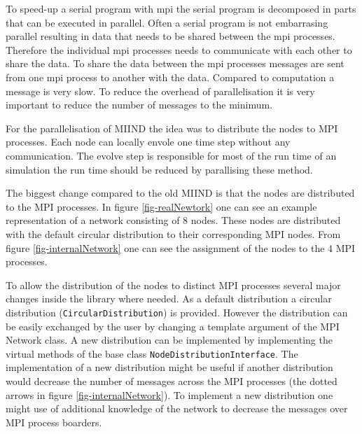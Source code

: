\documentclass[12pt]{article}
\begin{document}
To speed-up a serial program with mpi the serial program is decomposed in parts that can be executed in parallel.
Often a serial program is not embarrasing parallel resulting in data that needs to be shared between the mpi processes.
Therefore the individual mpi processes needs to communicate with each other to share the data.
To share the data between the mpi processes messages are sent from one mpi process to another with the data.
Compared to computation a message is very slow.
To reduce the overhead of parallelisation it is very important to reduce the number of messages to the minimum.


For the parallelisation of MIIND the idea was to distribute the nodes to MPI processes.
Each node can locally envole one time step without any communication.
The evolve step is responsible for most of the run time of an simulation the run time should be reduced by parallising these method.

The biggest change compared to the old MIIND is that the nodes are distributed to the MPI processes.
In figure \ref{fig-realNewtork} one can see an example representation of a network consisting of 8 nodes.
These nodes are distributed with the default circular distribution to their corresponding MPI nodes.
From figure \ref{fig-internalNetwork} one can see the assignment of the nodes to the 4 MPI processes.

To allow the distribution of the nodes to distinct MPI processes several major changes inside the library where needed.
As a default distribution a circular distribution (\texttt{CircularDistribution}) is provided.
However the distribution can be easily exchanged by the user by changing a template argument of the MPI Network class.
A new distribution can be implemented by implementing the virtual methods of the base class \texttt{NodeDistributionInterface}.
The implementation of a new distribution might be useful if another distribution would decrease the number of messages across the MPI processes (the dotted arrows in figure \ref{fig-internalNetwork}).
To implement a new distribution one might use of additional knowledge of the network to decrease the messages over MPI process boarders.
\end{document}
